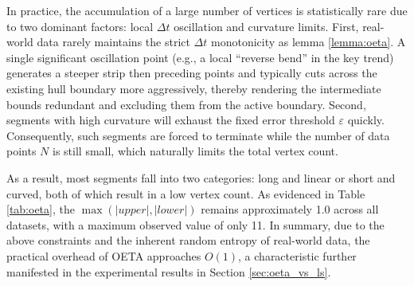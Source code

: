 In practice, the accumulation of a large number of vertices is statistically rare due to two dominant factors: local $\Delta t$ oscillation and curvature limits. First, real-world data rarely maintains the strict $\Delta t$ monotonicity as lemma \ref{lemma:oeta}. A single significant oscillation point (e.g., a local ``reverse bend'' in the key trend) generates a steeper strip then preceding points and typically cuts across the existing hull boundary more aggressively, thereby rendering the intermediate bounds redundant and excluding them from the active boundary. Second, segments with high curvature will exhaust the fixed error threshold $\varepsilon$ quickly. Consequently, such segments are forced to terminate while the number of data points $N$ is still small, which naturally limits the total vertex count. 

As a result, most segments fall into two categories: long and linear or short and curved, both of which result in a low vertex count. As evidenced in Table \ref{tab:oeta}, the $\max(|upper|, |lower|)$ remains approximately 1.0 across all datasets, with a maximum observed value of only 11. In summary, due to the above constraints and the inherent random entropy of real-world data, the practical overhead of OETA approaches $O(1)$, a characteristic further manifested in the experimental results in Section \ref{sec:oeta_vs_ls}.






